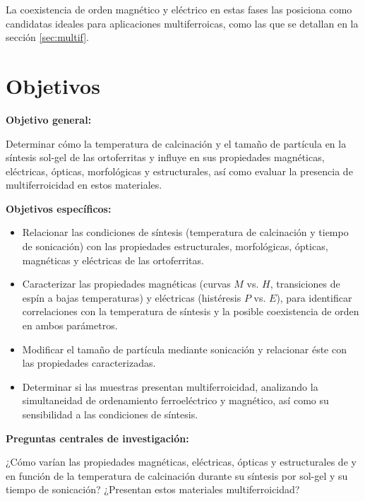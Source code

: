 \documentclass[../main.tex]{subfiles}
\begin{document}
La coexistencia de orden magnético y eléctrico en estas fases las posiciona como candidatas ideales para aplicaciones multiferroicas, como las que se detallan en la sección \ref{sec:multif}.
\chapter{Objetivos}
\textbf{Objetivo general:}

Determinar cómo la temperatura de calcinación y el tamaño de partícula en la síntesis sol-gel de las ortoferritas \neod{} y \sama{} influye en sus propiedades magnéticas, eléctricas, ópticas, morfológicas y estructurales, así como evaluar la presencia de multiferroicidad en estos materiales.

\textbf{Objetivos específicos:}
\begin{itemize}
    \item Relacionar las condiciones de síntesis (temperatura de calcinación y tiempo de sonicación) con las propiedades estructurales, morfológicas, ópticas, magnéticas y eléctricas de las ortoferritas.
    \item Caracterizar las propiedades magnéticas (curvas $M$ vs. $H$, transiciones de espín a bajas temperaturas) y eléctricas (histéresis $P$ vs. $E$), para identificar correlaciones con la temperatura de síntesis y la posible coexistencia de orden en ambos parámetros.
    \item Modificar el tamaño de partícula mediante sonicación y relacionar éste con las propiedades caracterizadas.
    \item Determinar si las muestras presentan multiferroicidad, analizando la simultaneidad de ordenamiento ferroeléctrico y magnético, así como su sensibilidad a las condiciones de síntesis.
\end{itemize}
\textbf{Preguntas centrales de investigación:}

¿Cómo varían las propiedades magnéticas, eléctricas, ópticas y estructurales de \neod{} y \sama{} en función de la temperatura de calcinación durante su síntesis por sol-gel y su tiempo de sonicación? ¿Presentan estos materiales multiferroicidad?
\end{document}
